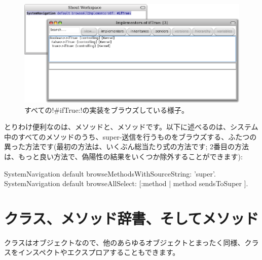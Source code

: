 \documentclass[a4paper,10pt,twoside]{book}
\begin{document}
\begin{figure}[ht]\centering
	\includegraphics[width=\linewidth]{implementors}
	\caption{すべての\ct!\#ifTrue:!の実装をブラウズしている様子。}
\end{figure}

とりわけ便利なのは、メソッドと、メソッドです。以下に述べるのは、システム中のすべてのメソッドのうち、super-送信を行うものをブラウズする、ふたつの異った方法です(最初の方法は、いくぶん総当たり式の方法です; 2番目の方法は、もっと良い方法で、偽陽性の結果をいくつか除外することができます): %
\begin{code}{}
SystemNavigation default browseMethodsWithSourceString: 'super'.
SystemNavigation default browseAllSelect: [:method | method sendsToSuper ].
\end{code}

\section{クラス、メソッド辞書、そしてメソッド}

クラスはオブジェクトなので、他のあらゆるオブジェクトとまったく同様、クラスをインスペクトやエクスプロアすることもできます。
\end{document}
